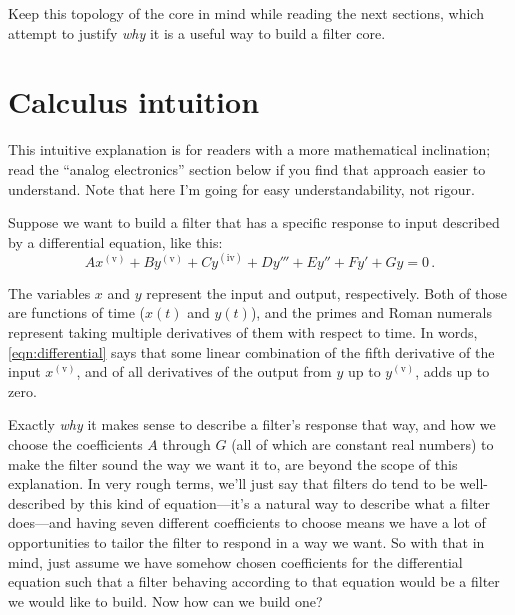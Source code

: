 {\centering\par}

Keep this topology of the core in mind while reading the next sections, which
attempt to justify \emph{why} it is a useful way to build a filter core.


\section{Calculus intuition}

This intuitive explanation is for readers with a more mathematical
inclination; read the ``analog electronics'' section below if you find
that approach easier to understand.  Note that here I'm going for easy
understandability, not rigour.

Suppose we want to build a filter that has a specific response to input
described by a differential equation, like this:
\begin{equation}
  Ax^{\mathrm{(v)}}+By^{\mathrm{(v)}}+Cy^{\mathrm{(iv)}}+Dy'''+Ey''+Fy'+Gy = 0 \, .
  \label{eqn:differential}
\end{equation}

The variables $x$ and $y$ represent the input and output, respectively. 
Both of those are functions of time ($x(t)$ and $y(t)$), and the primes and
Roman numerals represent taking multiple derivatives of them with respect to
time.  In words, \eqref{eqn:differential} says that some linear combination
of the fifth derivative of the input $x^{\mathrm{(v)}}$, and of all
derivatives of the output from $y$ up to $y^{\mathrm{(v)}}$, adds up to zero.

Exactly \emph{why} it makes sense to describe a filter's response that way,
and how we choose the coefficients $A$ through $G$ (all of which are
constant real numbers) to make the filter sound the way we want it to, are
beyond the scope of this explanation.  In very rough terms, we'll just say
that filters do tend to be well-described by this kind of equation---it's a
natural way to describe what a filter does---and having seven different
coefficients to choose means we have a lot of opportunities to tailor the
filter to respond in a way we want.  So with that in mind, just assume we
have somehow chosen coefficients for the differential equation such that a
filter behaving according to that equation would be a filter we would like
to build.  Now how can we build one?

